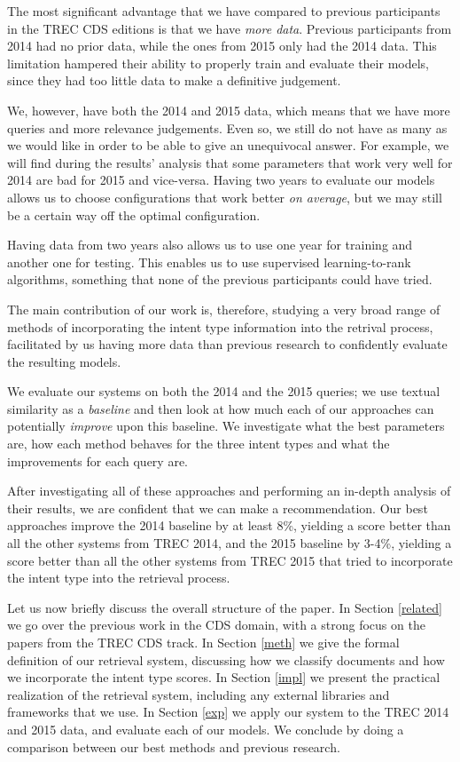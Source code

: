 The most significant advantage that we have compared to previous participants in the TREC CDS editions is 
that we have \emph{more data}. Previous participants from 2014 had no prior data, while the ones from 2015
only had the 2014 data. This limitation hampered their ability to properly train and evaluate their models, since they
had too little data to make a definitive judgement. 

We, however, have both the 2014 and 2015 data, which means that
we have more queries and more relevance judgements.
Even so, we still do not have as many as we would like in order to be able to give an unequivocal answer.
For example, we will find during the results' analysis
that some parameters that work very well for 2014 are bad for 2015 and vice-versa. Having two
years to evaluate our models allows us to choose configurations that work better \emph{on average}, but we
may still be a certain way off the optimal configuration.

Having data from two years also allows us to use one year for training and another one for testing.
This enables us to use supervised learning-to-rank algorithms,
something that none of the previous participants could have tried.

The main contribution of our work is, therefore, studying a very broad range of methods of incorporating
the intent type information into the retrival process, 
facilitated by us having more data than previous research to confidently evaluate the resulting models.

We evaluate our systems on both the 2014 and the 2015 queries; we use textual similarity
as a \emph{baseline} and then look at how much each of our approaches can potentially \emph{improve} upon this baseline.
We investigate what the best parameters are, how each method behaves for the three
intent types and what the improvements for each query are.

After investigating all of these approaches and performing an in-depth analysis of their results,
we are confident that we can make a recommendation.
Our best approaches improve the 2014 baseline by at least 8\%, yielding a score better than all the other systems from TREC 2014,
and the 2015 baseline by 3-4\%, yielding a score better than all the other systems from TREC 2015 that tried to incorporate the intent
type into the retrieval process.

Let us now briefly discuss the overall structure of the paper. In Section \ref{related} we go over the previous work
in the CDS domain, with a strong focus on the papers from the TREC CDS track. 
In Section \ref{meth} we give the formal definition of our retrieval system, discussing how we classify documents
and how we incorporate the intent type scores. 
In Section \ref{impl} we present the practical realization of the retrieval system, including any external libraries
and frameworks that we use.
In Section \ref{exp} we apply our system to the TREC 2014 and 2015 data, and evaluate each of our models.
We conclude by doing a comparison between our best methods and previous research.







